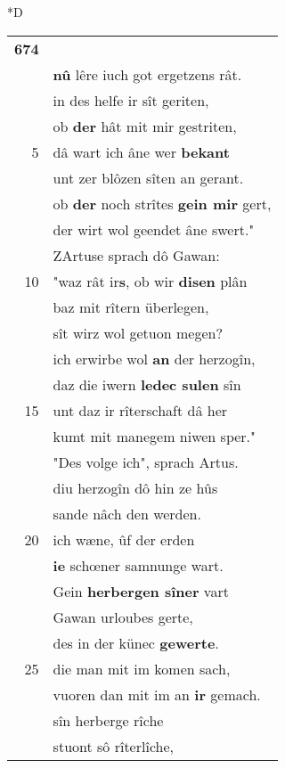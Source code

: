\documentclass[8pt,a4paper,notitlepage]{article}
\begin{document}
\begin{table}[ht]
\begin{minipage}[t]{0.5\linewidth}
\small
\begin{center}*D
\end{center}
\begin{tabular}{rl}
\textbf{674} & \textit{\begin{large}S\end{large}}ît ir mich \textbf{gesuochet} hât,\\ 
 & \textbf{nû} lêre iuch got ergetzens rât.\\ 
 & in des helfe ir sît geriten,\\ 
 & ob \textbf{der} hât mit mir gestriten,\\ 
5 & dâ wart ich âne wer \textbf{bekant}\\ 
 & unt zer blôzen sîten an gerant.\\ 
 & ob \textbf{der} noch strîtes \textbf{gein mir} gert,\\ 
 & der wirt wol geendet âne swert."\\ 
 & ZArtuse sprach dô Gawan:\\ 
10 & "waz rât ir\textbf{s}, ob wir \textbf{disen} plân\\ 
 & baz mit rîtern überlegen,\\ 
 & sît wirz wol getuon megen?\\ 
 & ich erwirbe wol \textbf{an} der herzogîn,\\ 
 & daz die iwern \textbf{ledec sulen} sîn\\ 
15 & unt daz ir rîterschaft dâ her\\ 
 & kumt mit manegem niwen sper."\\ 
 & "Des volge ich", sprach Artus.\\ 
 & diu herzogîn dô hin ze hûs\\ 
 & sande nâch den werden.\\ 
20 & ich wæne, ûf der erden\\ 
 & \textbf{ie} schœner samnunge wart.\\ 
 & Gein \textbf{herbergen sîner} vart\\ 
 & Gawan urloubes gerte,\\ 
 & des in der künec \textbf{gewerte}.\\ 
25 & die man mit im komen sach,\\ 
 & vuoren dan mit im an \textbf{ir} gemach.\\ 
 & sîn herberge rîche\\ 
 & stuont sô rîterlîche,\\ 

\end{tabular}
\end{minipage}
\end{table}
\end{document}
